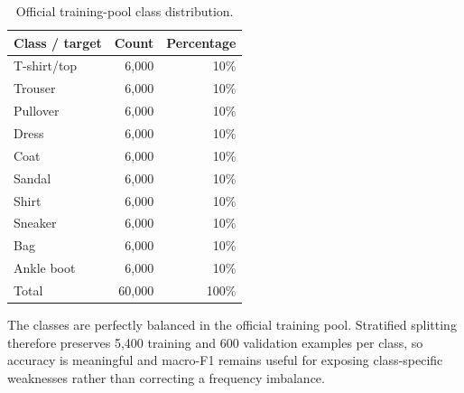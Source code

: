 \begin{table}[H]
    \centering
    \caption{Official training-pool class distribution.}
    \label{tab:target-distribution}
    \begin{tabular}{@{}lrr@{}}
        \toprule
        Class / target & Count & Percentage \\
        \midrule
        T-shirt/top & 6,000 & 10\% \\
        Trouser & 6,000 & 10\% \\
        Pullover & 6,000 & 10\% \\
        Dress & 6,000 & 10\% \\
        Coat & 6,000 & 10\% \\
        Sandal & 6,000 & 10\% \\
        Shirt & 6,000 & 10\% \\
        Sneaker & 6,000 & 10\% \\
        Bag & 6,000 & 10\% \\
        Ankle boot & 6,000 & 10\% \\
        \midrule
        Total & 60,000 & 100\% \\
        \bottomrule
    \end{tabular}
\end{table}

The classes are perfectly balanced in the official training pool. Stratified splitting therefore preserves 5,400 training and 600 validation examples per class, so accuracy is meaningful and macro-F1 remains useful for exposing class-specific weaknesses rather than correcting a frequency imbalance.

